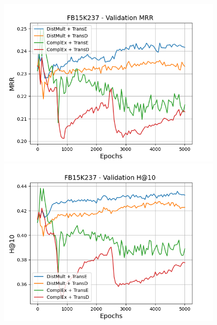 \begin{figure}
    \centering
    \begin{minipage}{.5\textwidth}
      \centering
      \includegraphics[width=\linewidth]{figures/results/gan_train/pretrained/uncertainty/max/entropy/fb15k237/5k_epochs/uncertainty_fb15k237_mrrs.png}
    \end{minipage}%
    \begin{minipage}{.5\textwidth}
      \centering
      \includegraphics[width=\linewidth]{figures/results/gan_train/pretrained/uncertainty/max/entropy/fb15k237/5k_epochs/uncertainty_fb15k237_hit10.png}
    \end{minipage}
    

\end{figure}
